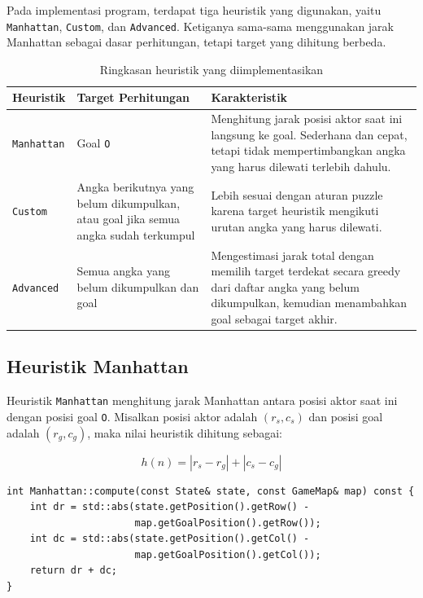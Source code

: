 Pada implementasi program, terdapat tiga heuristik yang digunakan, yaitu \texttt{Manhattan}, \texttt{Custom}, dan \texttt{Advanced}. 
Ketiganya sama-sama menggunakan jarak Manhattan sebagai dasar perhitungan, tetapi target yang dihitung berbeda.

\begin{table}[H]
	\centering
	\caption{Ringkasan heuristik yang diimplementasikan}
	\begin{tabular}{|p{3cm}|p{5cm}|p{6cm}|}
		\hline
		\rowcolor{orange!20}
		\textbf{Heuristik} & \textbf{Target Perhitungan} & \textbf{Karakteristik} \\
		\hline
		\texttt{Manhattan} & Goal \texttt{O} & Menghitung jarak posisi aktor saat ini langsung ke goal. Sederhana dan cepat, tetapi tidak mempertimbangkan angka yang harus dilewati terlebih dahulu. \\
		\hline
		\texttt{Custom} & Angka berikutnya yang belum dikumpulkan, atau goal jika semua angka sudah terkumpul & Lebih sesuai dengan aturan puzzle karena target heuristik mengikuti urutan angka yang harus dilewati. \\
		\hline
		\texttt{Advanced} & Semua angka yang belum dikumpulkan dan goal & Mengestimasi jarak total dengan memilih target terdekat secara greedy dari daftar angka yang belum dikumpulkan, kemudian menambahkan goal sebagai target akhir. \\
		\hline
	\end{tabular}
\end{table}

\subsection{Heuristik Manhattan}

Heuristik \texttt{Manhattan} menghitung jarak Manhattan antara posisi aktor saat ini dengan posisi goal \texttt{O}. 
Misalkan posisi aktor adalah $(r_s,c_s)$ dan posisi goal adalah $(r_g,c_g)$, maka nilai heuristik dihitung sebagai:

\[
	h(n)=|r_s-r_g|+|c_s-c_g|
\]

\begin{tcolorbox}[
	colback=orange!5,
	colframe=orange!70!black,
	title=\textbf{Potongan Implementasi Heuristik Manhattan},
	arc=2mm,
	boxrule=0.8pt
]
\small
\begin{verbatim}
int Manhattan::compute(const State& state, const GameMap& map) const {
    int dr = std::abs(state.getPosition().getRow() - 
                      map.getGoalPosition().getRow());
    int dc = std::abs(state.getPosition().getCol() - 
                      map.getGoalPosition().getCol());
    return dr + dc;
}
\end{verbatim}
\end{tcolorbox}

